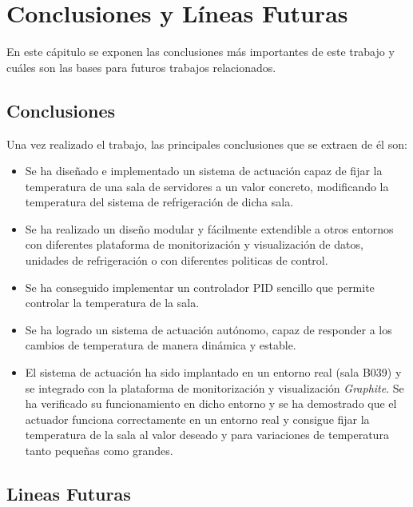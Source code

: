 \chapter{Conclusiones y Líneas Futuras}\label{cap:conclusiones}

	En este cápitulo se exponen las conclusiones más importantes de este trabajo y cuáles son las bases para futuros trabajos relacionados.

\section{Conclusiones}

\noindent Una vez realizado el trabajo, las principales conclusiones que se extraen de él son:

\begin{itemize}

\item Se ha diseñado e implementado un sistema de actuación capaz de fijar la temperatura de una sala de servidores a un valor concreto, modificando la temperatura del sistema de refrigeración de dicha sala.

\item Se ha realizado un diseño modular y fácilmente extendible a otros entornos con diferentes plataforma de monitorización y visualización de datos, unidades de refrigeración o con diferentes politicas de control.

\item Se ha conseguido implementar un controlador PID sencillo que permite controlar la temperatura de la sala.

\item Se ha logrado un sistema de actuación autónomo, capaz de responder a los cambios de temperatura de manera dinámica y estable.

\item El sistema de actuación ha sido implantado en un entorno real (sala B039) y se integrado con la plataforma de monitorización y visualización \textit{Graphite}. Se ha verificado su funcionamiento en dicho entorno y se ha demostrado que el actuador funciona correctamente en un entorno real y consigue fijar la temperatura de la sala al valor deseado y para variaciones de temperatura tanto pequeñas como grandes.

\end{itemize}

\section{Lineas Futuras}

